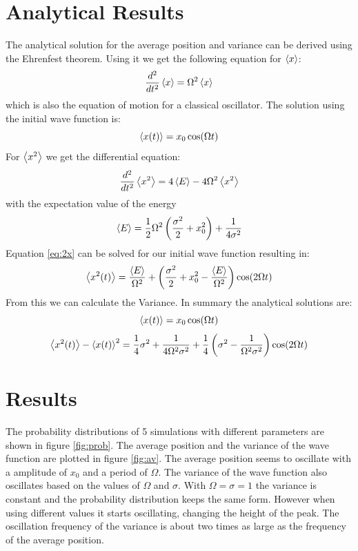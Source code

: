 \documentclass[12pt,a4paper]{article}
\begin{document}
\section{Analytical Results}
The analytical solution for the average position and variance can be derived using the Ehrenfest theorem. Using it we get the following equation for $\expval{x}$:
\begin{equation}
\dfrac{d^2}{dt^2} \expval{x} = \Omega^2 \expval{x}
\end{equation}
which is also the equation of motion for a classical oscillator. The solution using the initial wave function is:
\begin{equation}
\expval{x(t)} = x_0 \cos(\Omega t)
\end{equation}
For $\expval{x^2}$ we get the differential equation:
\begin{equation}
\dfrac{d^2}{dt^2} \expval{x^2} = 4\expval{E} - 4\Omega^2 \expval{x^2}
\label{eq:2x}
\end{equation}
with the expectation value of the energy
\begin{equation}
\expval{E} = \dfrac{1}{2}\Omega^2 \left(\dfrac{\sigma^2}{2} + x_0^2\right) + \dfrac{1}{4\sigma^2}
\end{equation}
Equation \ref{eq:2x} can be solved for our initial wave function resulting in:
\begin{equation}
\expval{x^2(t)} = \dfrac{\expval{E}}{\Omega^2} + \left(\dfrac{\sigma^2}{2} + x_0^2 - \dfrac{\expval{E}}{\Omega^2}\right) \cos(2\Omega t)
\end{equation}
From this we can calculate the Variance. In summary the analytical solutions are:
\begin{equation}
\expval{x(t)} = x_0 \cos(\Omega t)
\label{eq:xexp}
\end{equation}
\begin{equation}
\expval{x^2(t)} - \expval{x(t)}^2 = \dfrac{1}{4} \sigma^2 + \dfrac{1}{4 \Omega^2 \sigma^2} + \dfrac{1}{4}\left(\sigma^2 - \dfrac{1}{\Omega^2 \sigma^2}\right) \cos(2\Omega t)
\label{eq:2xexp}
\end{equation}

\section{Results}
The probability distributions of 5 simulations with different parameters are shown in figure \ref{fig:prob}. The average position and the variance of the wave function are plotted in figure \ref{fig:av}. The average position seems to oscillate with a amplitude of $x_0$ and a period of $\Omega$. The variance of the wave function also oscillates based on the values of $\Omega$ and $\sigma$. With $\Omega = \sigma = 1$ the variance is constant and the probability distribution keeps the same form. However when using different values it starts oscillating, changing the height of the peak. The oscillation frequency of the variance is about two times as large as the frequency of the average position.
\end{document}
